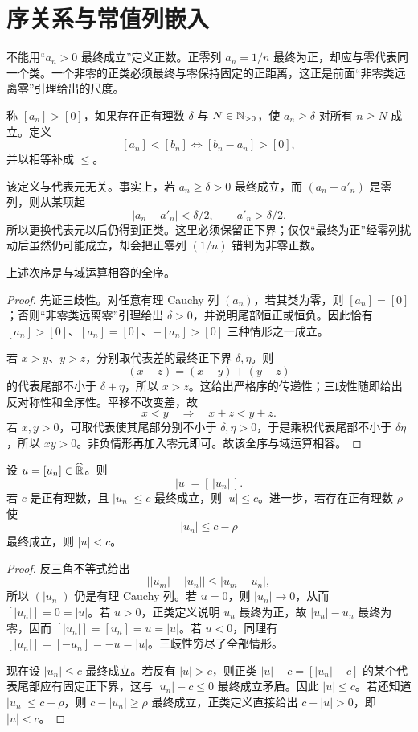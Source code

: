 \section{序关系与常值列嵌入}

不能用“\(a_n>0\) 最终成立”定义正数。正零列 \(a_n=1/n\) 最终为正，却应与零代表同一个类。一个非零的正类必须最终与零保持固定的正距离，这正是前面“非零类远离零”引理给出的尺度。


\begin{definition}
称 \([a_n]>[0]\)，如果存在正有理数 \(\delta\) 与 \(N\in\mathbb{N}_{>0}\)，使 \(a_n\ge\delta\) 对所有 \(n\ge N\) 成立。定义
\[
 [a_n]<[b_n]\Longleftrightarrow[b_n-a_n]>[0],
\]
并以相等补成 \(\le\)。
\end{definition}

该定义与代表元无关。事实上，若 \(a_n\ge\delta>0\) 最终成立，而 \((a_n-a'_n)\) 是零列，则从某项起
\[
  |a_n-a'_n|<\delta/2,\qquad a'_n>\delta/2.
\]
所以更换代表元以后仍得到正类。这里必须保留正下界；仅仅“最终为正”经零列扰动后虽然仍可能成立，却会把正零列 \((1/n)\) 错判为非零正数。

\begin{theorem}
上述次序是与域运算相容的全序。
\end{theorem}

\begin{proof}
先证三歧性。对任意有理 Cauchy 列 \((a_n)\)，若其类为零，则 \([a_n]=[0]\)；否则“非零类远离零”引理给出 \(\delta>0\)，并说明尾部恒正或恒负。因此恰有 \([a_n]>[0]\)、\([a_n]=[0]\)、\(-[a_n]>[0]\) 三种情形之一成立。

若 \(x>y\)、\(y>z\)，分别取代表差的最终正下界 \(\delta,\eta\)。则
\[
  (x-z)=(x-y)+(y-z)
\]
的代表尾部不小于 \(\delta+\eta\)，所以 \(x>z\)。这给出严格序的传递性；三歧性随即给出反对称性和全序性。平移不改变差，故
\[
  x<y\quad\Longrightarrow\quad x+z<y+z.
\]
若 \(x,y>0\)，可取代表使其尾部分别不小于 \(\delta,\eta>0\)，于是乘积代表尾部不小于 \(\delta\eta\)，所以 \(xy>0\)。非负情形再加入零元即可。故该全序与域运算相容。
\end{proof}

\begin{lemma}[代表估计与商序]
设 \(u=[u_n]\in\widehat{\mathbb{R}}\)。则
\[
 |u|=[\,|u_n|\,].
\]
若 \(c\) 是正有理数，且 \(|u_n|\le c\) 最终成立，则
\(|u|\le c\)。进一步，若存在正有理数 \(\rho\) 使
\[
 |u_n|\le c-\rho
\]
最终成立，则 \(|u|<c\)。
\end{lemma}

\begin{proof}
反三角不等式给出
\[
 \bigl||u_m|-|u_n|\bigr|\le |u_m-u_n|,
\]
所以 \((|u_n|)\) 仍是有理 Cauchy 列。若 \(u=0\)，则
\(|u_n|\to0\)，从而 \([|u_n|]=0=|u|\)。若 \(u>0\)，正类定义说明
\(u_n\) 最终为正，故 \(|u_n|-u_n\) 最终为零，因而
\([|u_n|]=[u_n]=u=|u|\)。若 \(u<0\)，同理有
\([|u_n|]=[-u_n]=-u=|u|\)。三歧性穷尽了全部情形。

现在设 \(|u_n|\le c\) 最终成立。若反有 \(|u|>c\)，则正类
\(|u|-c=[|u_n|-c]\) 的某个代表尾部应有固定正下界，这与
\(|u_n|-c\le0\) 最终成立矛盾。因此 \(|u|\le c\)。若还知道
\(|u_n|\le c-\rho\)，则 \(c-|u_n|\ge\rho\) 最终成立，正类定义直接给出
\(c-|u|>0\)，即 \(|u|<c\)。
\end{proof}

